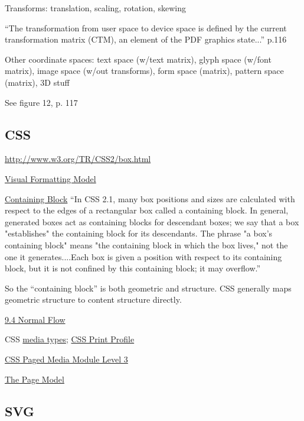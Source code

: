 \documentclass[12pt]{tufte-handout}
\numberwithin{equation}{subsection}
\numberwithin{equation}{subsection}
\begin{document}
\begin{appendices}
    Transforms: translation, scaling, rotation, skewing


    ``The transformation from user space to device space is defined by the current transformation matrix (CTM), an element of the PDF graphics state...'' p.116

    Other coordinate spaces: text space (w/text matrix), glyph space
    (w/font matrix), image space (w/out transforms), form space (matrix),
    pattern space (matrix), 3D stuff

    See figure 12, p. 117

    \subsection{CSS}

    \url{http://www.w3.org/TR/CSS2/box.html}

    \href{http://www.w3.org/TR/CSS2/visuren.html}{Visual Formatting Model}

    \href{http://www.w3.org/TR/CSS2/visuren.html#containing-block}{Containing
      Block} ``In CSS 2.1, many box positions and sizes are calculated
    with respect to the edges of a rectangular box called a containing
    block. In general, generated boxes act as containing blocks for
    descendant boxes; we say that a box "establishes" the containing block
    for its descendants. The phrase "a box's containing block" means "the
    containing block in which the box lives," not the one it
    generates....Each box is given a position with respect to its
    containing block, but it is not confined by this containing block; it
    may overflow.''

    So the ``containing block'' is both geometric and structure.  CSS
    generally maps geometric structure to content structure directly.

    \href{http://www.w3.org/TR/CSS2/visuren.html#normal-flow}{9.4 Normal Flow}

    CSS \href{http://www.w3.org/TR/CSS2/media.html}{media types}; \href{http://www.w3.org/TR/css-print/}{CSS Print Profile}

    \href{http://www.w3.org/TR/css3-page/}{CSS Paged Media Module Level 3}

    \href{http://www.w3.org/TR/css3-page/#page-model}{The Page Model}

    \subsection{SVG}


\end{appendices}
\end{document}
